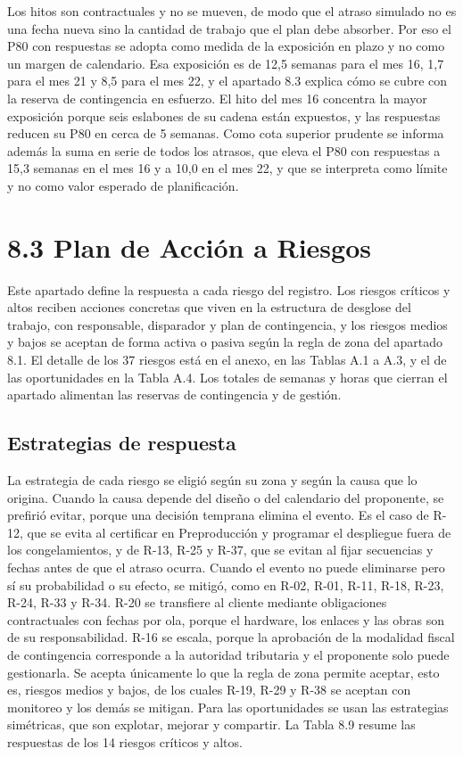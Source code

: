 \documentclass[11pt]{article}
\begin{document}
Los hitos son contractuales y no se mueven, de modo que el atraso simulado no es una fecha nueva sino la cantidad de trabajo que el plan debe absorber. Por eso el P80 con respuestas se adopta como medida de la exposición en plazo y no como un margen de calendario. Esa exposición es de 12,5 semanas para el mes 16, 1,7 para el mes 21 y 8,5 para el mes 22, y el apartado 8.3 explica cómo se cubre con la reserva de contingencia en esfuerzo. El hito del mes 16 concentra la mayor exposición porque seis eslabones de su cadena están expuestos, y las respuestas reducen su P80 en cerca de 5 semanas. Como cota superior prudente se informa además la suma en serie de todos los atrasos, que eleva el P80 con respuestas a 15,3 semanas en el mes 16 y a 10,0 en el mes 22, y que se interpreta como límite y no como valor esperado de planificación.

\section{8.3 Plan de Acción a Riesgos}\label{plan-de-acciuxf3n-a-riesgos}

Este apartado define la respuesta a cada riesgo del registro. Los riesgos críticos y altos reciben acciones concretas que viven en la estructura de desglose del trabajo, con responsable, disparador y plan de contingencia, y los riesgos medios y bajos se aceptan de forma activa o pasiva según la regla de zona del apartado 8.1. El detalle de los 37 riesgos está en el anexo, en las Tablas A.1 a A.3, y el de las oportunidades en la Tabla A.4. Los totales de semanas y horas que cierran el apartado alimentan las reservas de contingencia y de gestión.

\subsection{Estrategias de respuesta}

La estrategia de cada riesgo se eligió según su zona y según la causa que lo origina. Cuando la causa depende del diseño o del calendario del proponente, se prefirió evitar, porque una decisión temprana elimina el evento. Es el caso de R-12, que se evita al certificar en Preproducción y programar el despliegue fuera de los congelamientos, y de R-13, R-25 y R-37, que se evitan al fijar secuencias y fechas antes de que el atraso ocurra. Cuando el evento no puede eliminarse pero sí su probabilidad o su efecto, se mitigó, como en R-02, R-01, R-11, R-18, R-23, R-24, R-33 y R-34. R-20 se transfiere al cliente mediante obligaciones contractuales con fechas por ola, porque el hardware, los enlaces y las obras son de su responsabilidad. R-16 se escala, porque la aprobación de la modalidad fiscal de contingencia corresponde a la autoridad tributaria y el proponente solo puede gestionarla. Se acepta únicamente lo que la regla de zona permite aceptar, esto es, riesgos medios y bajos, de los cuales R-19, R-29 y R-38 se aceptan con monitoreo y los demás se mitigan. Para las oportunidades se usan las estrategias simétricas, que son explotar, mejorar y compartir. La Tabla 8.9 resume las respuestas de los 14 riesgos críticos y altos.
\end{document}
